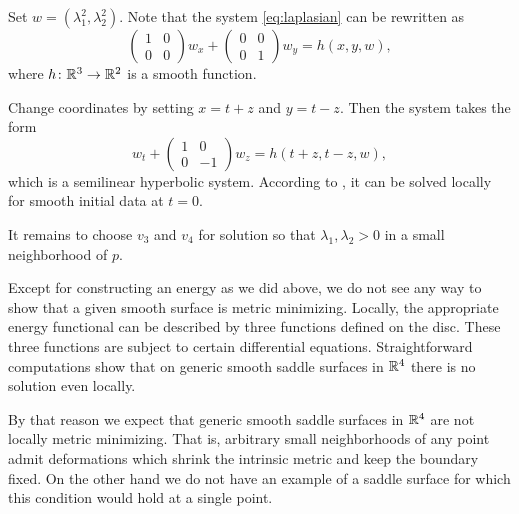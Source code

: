 \documentclass{article}
\begin{document}
Set $w=(\lambda_1^2,\lambda_2^2)$.
Note that the system \ref{eq:laplasian} can be rewritten as 
\[\left(\begin{smallmatrix}
   1&0\\0&0
  \end{smallmatrix}\right)
w_x
+
\left(\begin{smallmatrix}
   0&0\\0&1
  \end{smallmatrix}\right)
w_y=h(x,y,w),\]
where $h\colon\mathbb{R}^3\to\mathbb{R}^2$ is a smooth function.

Change coordinates by setting $x=t+z$ and $y=t-z$.
Then the system takes the form 
\[w_t+\left(\begin{smallmatrix}
   1&0\\0&-1
  \end{smallmatrix}\right)
w_z=h(t+z,t-z,w),\]
which is a semilinear hyperbolic system.
According to \cite[Theorem 3.6]{bressan}, it can be solved locally for smooth initial data at $t=0$.

It remains to choose $v_3$ and $v_4$ for solution so that $\lambda_1, \lambda_2>0$ in a small neighborhood of $p$.
\qeds

Except for constructing an energy as we did above,
we do not see any way to show that a given smooth surface is metric minimizing.
Locally, the appropriate energy functional can be described by three functions defined on the disc.
These three functions are subject to certain differential equations.
Straightforward computations show that on generic smooth saddle surfaces in $\mathbb{R}^4$ 
there is no solution even locally.

By that reason we expect that generic smooth saddle surfaces in $\mathbb{R}^4$ are not locally metric minimizing. 
That is, arbitrary small neighborhoods of any point admit deformations which shrink 
the intrinsic metric and keep the boundary fixed.
On the other hand we do not have an example of a saddle surface for which this condition would hold at a single point.
\end{document}
